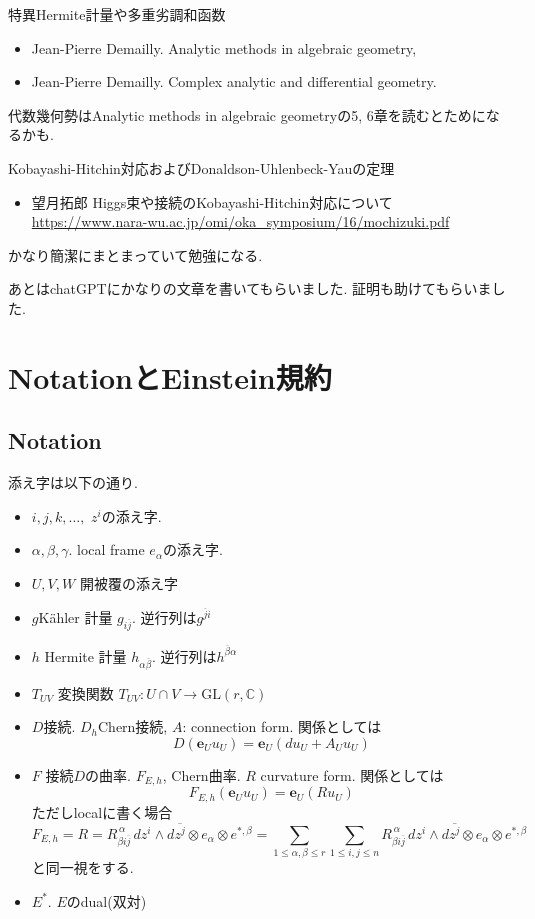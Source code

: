 \documentclass[dvipdfmx,a4paper,11pt]{article} %
\theoremstyle{definition}
\theoremstyle{remark}
\numberwithin{equation}{section}
\newcommand{\C}{\mathbb{C}}
\newcommand{\xr}[1]{\textcolor{red}{#1}}
\begin{document}
特異Hermite計量や多重劣調和函数
\begin{itemize}
\item \cite{Dem12} Jean-Pierre Demailly. Analytic methods in algebraic geometry,
\item\cite{Demagbook} Jean-Pierre Demailly. Complex analytic and differential geometry.
\end{itemize}
代数幾何勢はAnalytic methods in algebraic geometryの5, 6章を読むとためになるかも. 

Kobayashi-Hitchin対応およびDonaldson-Uhlenbeck-Yauの定理
\begin{itemize}
\item 望月拓郎 Higgs束や接続のKobayashi-Hitchin対応について \url{https://www.nara-wu.ac.jp/omi/oka_symposium/16/mochizuki.pdf}
\end{itemize}
かなり簡潔にまとまっていて勉強になる. 

あとはchatGPTにかなりの文章を書いてもらいました. 証明も助けてもらいました. 
\newpage

\setcounter{section}{-1}
\section{NotationとEinstein規約}
\subsection{Notation}


添え字は以下の通り. 
\begin{itemize}
\item $i,j,k,\ldots, $ $z^i$の添え字. 
\item $\alpha, \beta, \gamma$. local frame  $e_{\alpha}$の添え字.
\item $U, V, W$ 開被覆の添え字  
\item $g$K\"ahler 計量 $g_{i \overline{j}}$. 逆行列は$g^{\overline{j}i}$
\item $h$ Hermite 計量 $h_{\alpha \overline{\beta}}$. 逆行列は$h^{\overline{\beta}\alpha}$
\item $T_{UV}$ 変換関数 $T_{UV} : U \cap V \to \mathrm{GL}(r, \C)$
\item $D$接続. $D_h$Chern接続, $A$: connection form. 関係としては
$$
D(\mathbf{e}_U u_U)
=
\mathbf{e}_U(du_U+A_U u_U)
$$
\item $F$ 接続$D$の曲率. $F_{E,h}$, Chern曲率. $R$ curvature form. 関係としては
$$
F_{E, h}(\mathbf{e}_U u_U)
=
\mathbf{e}_U(R u_U)
$$
ただしlocalに書く場合
$$
F_{E,h} = R = R_{\beta i\overline{j}}^{\,\alpha}\,dz^i\wedge d\overline{z^j} \otimes e_{\alpha} \otimes e^{*, \beta}
=\sum_{1\le \alpha, \beta \le r}\sum_{1 \le i,j \le n}
 R_{\beta i\overline{j}}^{\,\alpha}\,dz^i\wedge d\overline{z^j} \otimes e_{\alpha} \otimes e^{*, \beta}
$$
と同一視をする. 
\item $E^{*}$. $E$のdual(双対)
\end{itemize}
\end{document}
